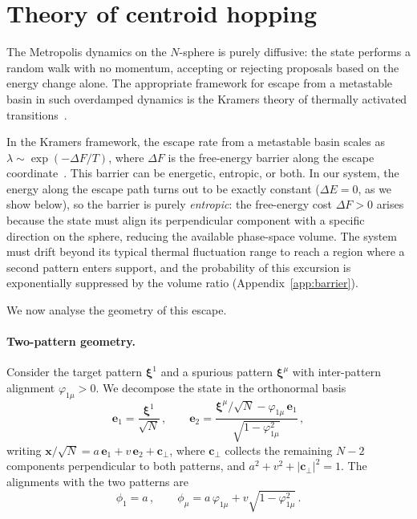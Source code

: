 \documentclass[11pt]{article}
\newcommand{\bxi}{\boldsymbol{\xi}}
\newcommand{\bx}{\bm{x}}
\begin{document}
\section{Theory of centroid hopping}
\label{sec:theory}

The Metropolis dynamics on the $N$-sphere is purely diffusive: the state performs a random walk with no momentum, accepting or rejecting proposals based on the energy change alone.  The appropriate framework for escape from a metastable basin in such overdamped dynamics is the Kramers theory of thermally activated transitions~\citep{kramers1940,hanggi1990}.

In the Kramers framework, the escape rate from a metastable basin scales as $\lambda \sim \exp(-\Delta F/T)$, where $\Delta F$ is the free-energy barrier along the escape coordinate~\citep{hanggi1990}.  This barrier can be energetic, entropic, or both.  In our system, the energy along the escape path turns out to be exactly constant ($\Delta E = 0$, as we show below), so the barrier is purely \emph{entropic}: the free-energy cost $\Delta F > 0$ arises because the state must align its perpendicular component with a specific direction on the sphere, reducing the available phase-space volume.  The system must drift beyond its typical thermal fluctuation range to reach a region where a second pattern enters support, and the probability of this excursion is exponentially suppressed by the volume ratio (Appendix~\ref{app:barrier}).

We now analyse the geometry of this escape.

\paragraph{Two-pattern geometry.}
Consider the target pattern $\bxi^1$ and a spurious pattern $\bxi^\mu$ with inter-pattern alignment $\varphi_{1\mu} > 0$.  We decompose the state in the orthonormal basis
\begin{equation}
\mathbf{e}_1 = \frac{\bxi^1}{\sqrt{N}}\,, \qquad
\mathbf{e}_2 = \frac{\bxi^\mu/\sqrt{N} - \varphi_{1\mu}\,\mathbf{e}_1}{\sqrt{1-\varphi_{1\mu}^2}}\,,
\label{eq:basis}
\end{equation}
writing $\bx/\sqrt{N} = a\,\mathbf{e}_1 + v\,\mathbf{e}_2 + \mathbf{c}_\perp$, where $\mathbf{c}_\perp$ collects the remaining $N{-}2$ components perpendicular to both patterns, and $a^2 + v^2 + |\mathbf{c}_\perp|^2 = 1$.  The alignments with the two patterns are
\begin{equation}
\phi_1 = a\,, \qquad \phi_\mu = a\,\varphi_{1\mu} + v\sqrt{1-\varphi_{1\mu}^2}\,.
\label{eq:overlaps}
\end{equation}
\end{document}
